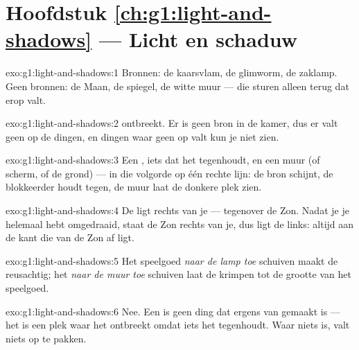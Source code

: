 \section*{Hoofdstuk \ref{ch:g1:light-and-shadows} --- Licht en schaduw}

\begin{solution}{exo:g1:light-and-shadows:1}
Bronnen: de kaarsvlam, de glimworm, de zaklamp. Geen bronnen: de
Maan, de spiegel, de witte muur --- die sturen alleen  terug dat
erop valt.
\end{solution}

\begin{solution}{exo:g1:light-and-shadows:2}
 ontbreekt. Er is geen bron in de kamer, dus er valt geen
 op de dingen, en dingen waar geen  op valt kun je niet
zien.
\end{solution}

\begin{solution}{exo:g1:light-and-shadows:3}
Een , iets dat het  tegenhoudt, en een muur (of scherm,
of de grond) --- in die volgorde op één rechte lijn: de bron schijnt,
de blokkeerder houdt tegen, de muur laat de donkere plek zien.
\end{solution}

\begin{solution}{exo:g1:light-and-shadows:4}
De  ligt rechts van je --- tegenover de Zon. Nadat je je
helemaal hebt omgedraaid, staat de Zon rechts van je, dus ligt de
 links: altijd aan de kant die van de Zon af ligt.
\end{solution}

\begin{solution}{exo:g1:light-and-shadows:5}
Het speelgoed \emph{naar de lamp toe} schuiven maakt de 
reusachtig; het \emph{naar de muur toe} schuiven laat de 
krimpen tot de grootte van het speelgoed.
\end{solution}

\begin{solution}{exo:g1:light-and-shadows:6}
Nee. Een  is geen ding dat ergens van gemaakt is --- het is een
plek waar het  ontbreekt omdat iets het  tegenhoudt. Waar
niets is, valt niets op te pakken.
\end{solution}

